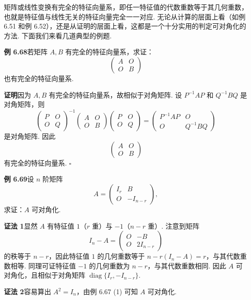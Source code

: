 \documentclass[UTF8,12pt,a4paper,fontset=fandol]{ctexart}
\begin{document}
矩阵或线性变换有完全的特征向量系，即任一特征值的代数重数等于其几何重数，也就是特征值与线性无关的特征向量完全一一对应. 无论从计算的层面上看（如例 6.51 和例 6.52），还是从证明的层面上看，这都是一个十分实用的判定可对角化的方法. 下面我们来看几道典型的例题.

\noindent\textbf{例 6.68}\quad 若矩阵 $A,B$ 有完全的特征向量系，求证：
\[
\left(\begin{array}{cc}
A & O\\
O & B
\end{array}\right)
\]
也有完全的特征向量系.

\noindent\textbf{证明}\quad 因为 $A,B$ 有完全的特征向量系，故相似于对角矩阵. 设 $P^{-1}AP$ 和 $Q^{-1}BQ$ 是对角矩阵，则
\[
\left(\begin{array}{cc}
P & O\\
O & Q
\end{array}\right)^{-1}
\left(\begin{array}{cc}
A & O\\
O & B
\end{array}\right)
\left(\begin{array}{cc}
P & O\\
O & Q
\end{array}\right)
=\left(\begin{array}{cc}
P^{-1}AP & O\\
O & Q^{-1}BQ
\end{array}\right)
\]
是对角矩阵. 因此
\[
\left(\begin{array}{cc}
A & O\\
O & B
\end{array}\right)
\]
有完全的特征向量系. $\square$

\noindent\textbf{例 6.69}\quad 设 $n$ 阶矩阵
\[
A=\left(\begin{array}{cc}
I_r & B\\
O & -I_{n-r}
\end{array}\right),
\]
求证：$A$ 可对角化.

\noindent\textbf{证法 1}\quad 显然 $A$ 有特征值 $1$（$r$ 重）与 $-1$（$n-r$ 重）. 注意到矩阵
\[
I_n-A=\left(\begin{array}{cc}
O & -B\\
O & 2I_{n-r}
\end{array}\right)
\]
的秩等于 $n-r$，因此特征值 $1$ 的几何重数等于 $n-r(I_n-A)=r$，与其代数重数相等. 同理可证特征值 $-1$ 的几何重数为 $n-r$，与其代数重数相同. 因此 $A$ 可对角化，且相似于对角矩阵 $\operatorname{diag}\{I_r,-I_{n-r}\}$.

\noindent\textbf{证法 2}\quad 容易算出 $A^2=I_n$，由例 6.67 (1) 可知 $A$ 可对角化.
\end{document}
